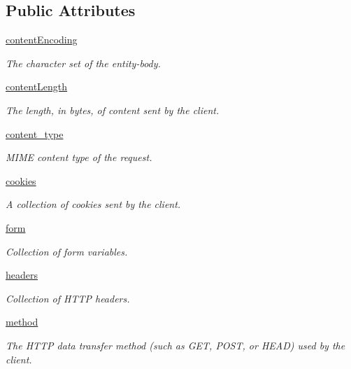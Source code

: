 \subsection*{Public Attributes}
\begin{DoxyCompactItemize}
\item 
\hyperlink{class_http_request_1_1_http_request_a37deed6d8791b240c1db458c0f3eb95d}{content\-Encoding}
\begin{DoxyCompactList}\small\item\em The character set of the entity-\/body. \end{DoxyCompactList}\item 
\hyperlink{class_http_request_1_1_http_request_aa37faef2bdb70d29c6ce741d7362dad4}{content\-Length}
\begin{DoxyCompactList}\small\item\em The length, in bytes, of content sent by the client. \end{DoxyCompactList}\item 
\hyperlink{class_http_request_1_1_http_request_a588d3bb83d3d30c0de69c7175d9500ba}{content\-\_\-type}
\begin{DoxyCompactList}\small\item\em M\-I\-M\-E content type of the request. \end{DoxyCompactList}\item 
\hyperlink{class_http_request_1_1_http_request_a64b3bf1ae5347ad8570527ec6c390897}{cookies}
\begin{DoxyCompactList}\small\item\em A collection of cookies sent by the client. \end{DoxyCompactList}\item 
\hyperlink{class_http_request_1_1_http_request_a7e77838e0ad5a1dbc61cc2a5eba94fad}{form}
\begin{DoxyCompactList}\small\item\em Collection of form variables. \end{DoxyCompactList}\item 
\hyperlink{class_http_request_1_1_http_request_ab06f3b22757af971c0958d6d73028c11}{headers}
\begin{DoxyCompactList}\small\item\em Collection of H\-T\-T\-P headers. \end{DoxyCompactList}\item 
\hyperlink{class_http_request_1_1_http_request_a2ef110e9c384476bc8b20d52b075911a}{method}
\begin{DoxyCompactList}\small\item\em The H\-T\-T\-P data transfer method (such as G\-E\-T, P\-O\-S\-T, or H\-E\-A\-D) used by the client. \end{DoxyCompactList}\item 

\end{DoxyCompactItemize}
